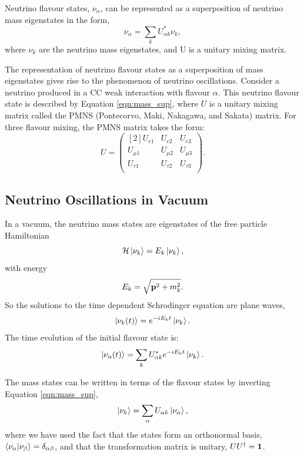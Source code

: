 Neutrino flavour states, $\nu_\alpha$, can be represented as a superposition of 
neutrino mass eigenstates in the form,
\begin{equation}
	\label{eqn:mass_sup}
	\nu_\alpha = \sum_{k} U^*_{\alpha k} \nu_k,
\end{equation}
where $\nu_k$ are the neutrino mass eigenstates, and U is a unitary mixing
matrix. 

The representation of neutrino flavour states as a superposition of mass 
eigenstates gives rise to the phenomenon of neutrino oscillations. Consider a 
neutrino produced in a CC weak interaction with flavour \(\alpha\). 
This neutrino flavour state is described by Equation \ref{eqn:mass_sup},
where \(U\) is a unitary mixing matrix called the PMNS 
(Pontecorvo, Maki, Nakagawa, and Sakata) matrix. For three flavour mixing, the 
PMNS matrix takes the form:
\begin{equation*}
	U = 
	\begin{pmatrix}[2]
		U_{e1} & U_{e2} & U_{e3} \\
		U_{\mu1} & U_{\mu2} & U_{\mu3} \\
		U_{\tau1} & U_{\tau2} & U_{\tau3} \\
	\end{pmatrix}.
\end{equation*}

\subsection{Neutrino Oscillations in Vacuum}
In a vacuum, the neutrino mass states are eigenstates of the free particle Hamiltonian
\begin{equation*}
	{\cal H} \ket{\nu_k} = E_k \ket{\nu_k},
\end{equation*}
with energy
\begin{equation*}
	E_k = \sqrt{\vb{p}^2 + m_k^2}.
\end{equation*}
So the solutions to the time dependent Schrodinger equation are plane waves,
\begin{equation*}
	\ket{\nu_k(t)} = e^{-iE_kt}\ket{\nu_k}.
\end{equation*}
The time evolution of the initial flavour state is:
\begin{equation}
	\label{eqn:flavour_time_mass}
	\ket{\nu_\alpha(t)} = \sum_k U_{\alpha k}^* e^{-iE_kt} \ket{\nu_k}.
\end{equation}

\noindent
The mass states can be written in terms of the flavour states by inverting
Equation \ref{eqn:mass_sup},
\begin{equation}
	\label{eqn:flav_sup}
	\ket{\nu_k} = \sum_\alpha U_{\alpha k} \ket{\nu_\alpha},
\end{equation}
where we have used the fact that the states form an orthonormal basis,
\(\braket{\nu_\alpha}{\nu_\beta} = \delta_{\alpha \beta}\), and that the 
transformation matrix is unitary, \(UU^\dagger = \vb{1}\).

